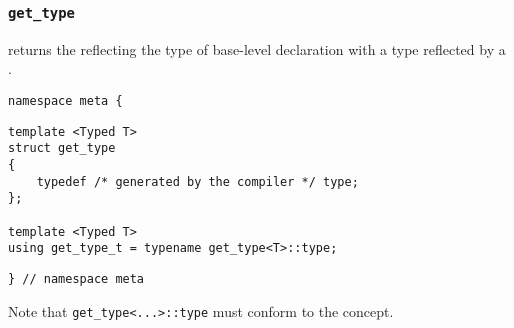 

\subsubsection{\texttt{get\_type}}

returns the  reflecting the type of base-level declaration with a type reflected by a .

\begin{verbatim}
namespace meta {
\end{verbatim}
\begin{verbatim}
template <Typed T>
struct get_type
{
	typedef /* generated by the compiler */ type;
};
	
template <Typed T>
using get_type_t = typename get_type<T>::type;

\end{verbatim}
\begin{verbatim}
} // namespace meta
\end{verbatim}


Note that \texttt{get\_type<...>::type}
must conform to the  concept.
